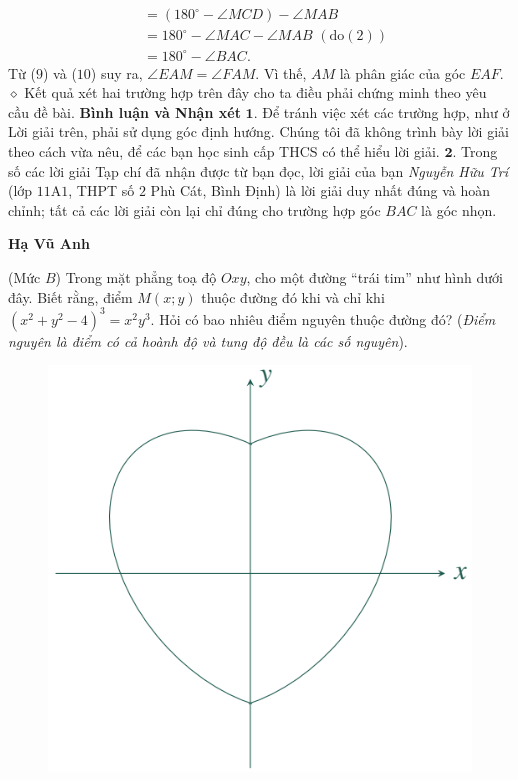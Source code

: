\begin{multicols}{2}
\begin{align*}
				&= \left( {{{180}^{\circ}} - \angle MCD} \right) - \angle MAB\\
				&= {180^{\circ}} - \angle MAC - \angle MAB\,\,({\text{do}}(2))\\
				&= {180^{\circ}} - \angle BAC. \tag{$10$}
	\end{align*}
	Từ ($9$) và ($10$) suy ra, $\angle EAM = \angle FAM$.  Vì thế, $AM$ là phân giác của góc $EAF$.
	\vskip 0.05cm
	$\diamond$ Kết quả xét hai trường hợp trên đây cho ta điều phải chứng minh theo yêu cầu đề bài.
	\vskip 0.05cm
	\textbf{\color{thachthuctoanhoc}Bình luận và Nhận xét}
	\vskip 0.05cm
	$\pmb{1.}$ Để tránh việc xét các trường hợp, như ở Lời giải trên, phải sử dụng góc định hướng. Chúng tôi đã không trình bày lời giải theo cách vừa nêu, để các bạn học sinh cấp THCS có thể hiểu lời giải.
	\vskip 0.05cm
	$\pmb{2.}$ Trong số các lời giải Tạp chí đã nhận được từ bạn đọc, lời giải của bạn \textit{Nguyễn Hữu Trí} (lớp $11$A$1$, THPT số $2$ Phù Cát, Bình Định) là lời giải duy nhất đúng và hoàn chỉnh; tất cả các lời giải còn lại chỉ đúng cho trường hợp góc $BAC$ là góc nhọn.
	\begin{flushright}
		\textbf{\color{thachthuctoanhoc}Hạ Vũ Anh}
	\end{flushright}
	{}
	(Mức $B$) Trong mặt phẳng toạ độ $Oxy$, cho một đường ``trái tim'' như hình dưới đây. Biết rằng, điểm $M(x;y)$ thuộc đường đó khi và chỉ khi $\left(x^2\!+\!y^2\!-\!4\right)^{\!3}\!=\! x^2y^3$. Hỏi có bao nhiêu điểm nguyên thuộc đường đó?  
	\vskip 0.05cm
	({\it Điểm nguyên là điểm có cả hoành độ và tung độ đều là các số nguyên}).
	\begin{figure}[H]
		\centering
		\vspace*{-5pt}
		\captionsetup{labelformat= empty, justification=centering}
		\includegraphics[width=0.8\linewidth]{P1}

\end{figure}
\end{multicols}
